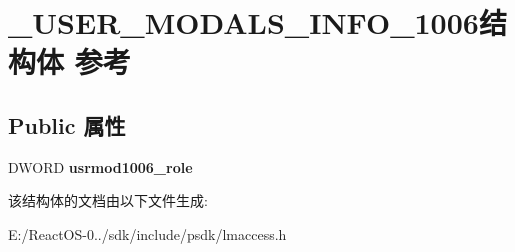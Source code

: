 \hypertarget{struct___u_s_e_r___m_o_d_a_l_s___i_n_f_o__1006}{}\section{\+\_\+\+U\+S\+E\+R\+\_\+\+M\+O\+D\+A\+L\+S\+\_\+\+I\+N\+F\+O\+\_\+1006结构体 参考}
\label{struct___u_s_e_r___m_o_d_a_l_s___i_n_f_o__1006}
\subsection*{Public 属性}
\begin{DoxyCompactItemize}
\item 
\mbox{\label{struct___u_s_e_r___m_o_d_a_l_s___i_n_f_o__1006_a105910057d930f16972bae5ffb074fce}} 
D\+W\+O\+RD {\bfseries usrmod1006\+\_\+role}
\end{DoxyCompactItemize}


该结构体的文档由以下文件生成\+:\begin{DoxyCompactItemize}
\item 
E\+:/\+React\+O\+S-\/0../sdk/include/psdk/lmaccess.\+h\end{DoxyCompactItemize}
